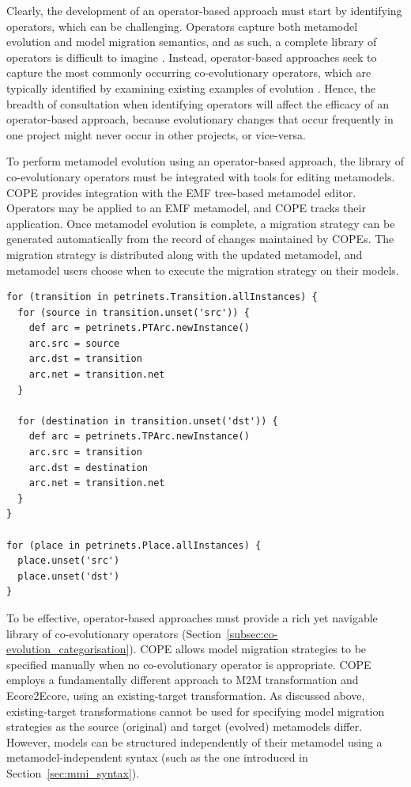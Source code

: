 Clearly, the development of an operator-based approach must start by identifying operators, which can be challenging. Operators capture both metamodel evolution and model migration semantics, and as such, a complete library of operators is difficult to imagine \cite{lerner00model}. Instead, operator-based approaches seek to capture the most commonly occurring co-evolutionary operators, which are typically identified by examining existing examples of evolution \cite{herrmannsdoerfer08automatability}. Hence, the breadth of consultation when identifying operators will affect the efficacy of an operator-based approach, because evolutionary changes that occur frequently in one project might never occur in other projects, or vice-versa.

To perform metamodel evolution using an operator-based approach, the library of co-evolutionary operators must be integrated with tools for editing metamodels. COPE provides integration with the EMF tree-based metamodel editor. Operators may be applied to an EMF metamodel, and COPE tracks their application. Once metamodel evolution is complete, a migration strategy can be generated automatically from the record of changes maintained by COPEs. The migration strategy is distributed along with the updated metamodel, and metamodel users choose when to execute the migration strategy on their models.

\begin{lstlisting}[float=tbp, caption=Petri nets model migration in COPE, label=lst:cope, language=COPE]
for (transition in petrinets.Transition.allInstances) {
  for (source in transition.unset('src')) {
    def arc = petrinets.PTArc.newInstance()
    arc.src = source
    arc.dst = transition
    arc.net = transition.net
  }
  
  for (destination in transition.unset('dst')) {
    def arc = petrinets.TPArc.newInstance() 
    arc.src = transition
    arc.dst = destination
    arc.net = transition.net
  }
}

for (place in petrinets.Place.allInstances) {
  place.unset('src')
  place.unset('dst')
}
\end{lstlisting}

To be effective, operator-based approaches must provide a rich yet navigable library of co-evolutionary operators (Section~\ref{subsec:co-evolution_categorisation}). COPE allows model migration strategies to be specified manually when no co-evolutionary operator is appropriate. COPE employs a fundamentally different approach to M2M transformation and Ecore2Ecore, using an existing-target transformation. As discussed above, existing-target transformations cannot be used for specifying model migration strategies as the source (original) and target (evolved) metamodels differ. However, models can be structured independently of their metamodel using a metamodel-independent syntax (such as the one introduced in Section~\ref{sec:mmi_syntax}).

